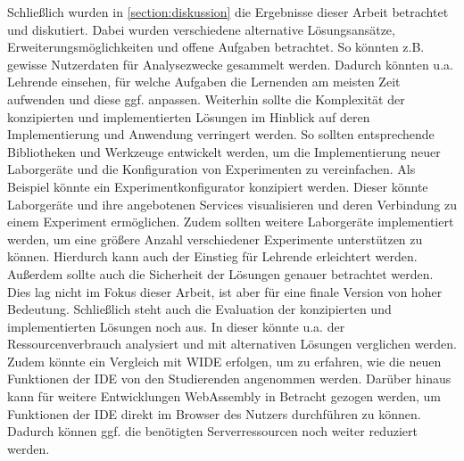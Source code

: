 Schließlich wurden in \autoref{section:diskussion} die Ergebnisse dieser Arbeit betrachtet und diskutiert. Dabei wurden verschiedene alternative Lösungsansätze, Erweiterungsmöglichkeiten und offene Aufgaben betrachtet. So könnten z.B. gewisse Nutzerdaten für Analysezwecke gesammelt werden. Dadurch könnten u.a. Lehrende einsehen, für welche Aufgaben die Lernenden am meisten Zeit aufwenden und diese ggf. anpassen. Weiterhin sollte die Komplexität der konzipierten und implementierten Lösungen im Hinblick auf deren Implementierung und Anwendung verringert werden. So sollten entsprechende Bibliotheken und Werkzeuge entwickelt werden, um die Implementierung neuer Laborgeräte und die Konfiguration von Experimenten zu vereinfachen. Als Beispiel könnte ein Experimentkonfigurator konzipiert werden. Dieser könnte Laborgeräte und ihre angebotenen Services visualisieren und deren Verbindung zu einem Experiment ermöglichen. Zudem sollten weitere Laborgeräte implementiert werden, um eine größere Anzahl verschiedener Experimente unterstützen zu können. Hierdurch kann auch der Einstieg für Lehrende erleichtert werden. Außerdem sollte auch die Sicherheit der Lösungen genauer betrachtet werden. Dies lag nicht im Fokus dieser Arbeit, ist aber für eine finale Version von hoher Bedeutung. Schließlich steht auch die Evaluation der konzipierten und implementierten Lösungen noch aus. In dieser könnte u.a. der Ressourcenverbrauch analysiert und mit alternativen Lösungen verglichen werden. Zudem könnte ein Vergleich mit WIDE erfolgen, um zu erfahren, wie die neuen Funktionen der IDE von den Studierenden angenommen werden. Darüber hinaus kann für weitere Entwicklungen WebAssembly in Betracht gezogen werden, um Funktionen der IDE direkt im Browser des Nutzers durchführen zu können. Dadurch können ggf. die benötigten Serverressourcen noch weiter reduziert werden.